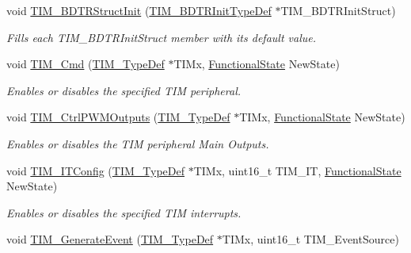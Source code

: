 \begin{DoxyCompactItemize}
void \mbox{\hyperlink{group___t_i_m___private___functions_gaea0f49938cda8ae0738162194798afc6}{T\+I\+M\+\_\+\+B\+D\+T\+R\+Struct\+Init}} (\mbox{\hyperlink{struct_t_i_m___b_d_t_r_init_type_def}{T\+I\+M\+\_\+\+B\+D\+T\+R\+Init\+Type\+Def}} $\ast$T\+I\+M\+\_\+\+B\+D\+T\+R\+Init\+Struct)
\begin{DoxyCompactList}\small\item\em Fills each T\+I\+M\+\_\+\+B\+D\+T\+R\+Init\+Struct member with its default value. \end{DoxyCompactList}\item 
void \mbox{\hyperlink{group___t_i_m___private___functions_ga2bdc275bcbd2ce9d1ba632e6c89896b7}{T\+I\+M\+\_\+\+Cmd}} (\mbox{\hyperlink{struct_t_i_m___type_def}{T\+I\+M\+\_\+\+Type\+Def}} $\ast$T\+I\+Mx, \mbox{\hyperlink{group___exported__types_gac9a7e9a35d2513ec15c3b537aaa4fba1}{Functional\+State}} New\+State)
\begin{DoxyCompactList}\small\item\em Enables or disables the specified T\+IM peripheral. \end{DoxyCompactList}\item 
void \mbox{\hyperlink{group___t_i_m___private___functions_ga3e59ebced2ab8e0b817c460f1670e97d}{T\+I\+M\+\_\+\+Ctrl\+P\+W\+M\+Outputs}} (\mbox{\hyperlink{struct_t_i_m___type_def}{T\+I\+M\+\_\+\+Type\+Def}} $\ast$T\+I\+Mx, \mbox{\hyperlink{group___exported__types_gac9a7e9a35d2513ec15c3b537aaa4fba1}{Functional\+State}} New\+State)
\begin{DoxyCompactList}\small\item\em Enables or disables the T\+IM peripheral Main Outputs. \end{DoxyCompactList}\item 
void \mbox{\hyperlink{group___t_i_m___private___functions_ga70e3d6c09d55ee69002e154c85cd40e4}{T\+I\+M\+\_\+\+I\+T\+Config}} (\mbox{\hyperlink{struct_t_i_m___type_def}{T\+I\+M\+\_\+\+Type\+Def}} $\ast$T\+I\+Mx, uint16\+\_\+t T\+I\+M\+\_\+\+IT, \mbox{\hyperlink{group___exported__types_gac9a7e9a35d2513ec15c3b537aaa4fba1}{Functional\+State}} New\+State)
\begin{DoxyCompactList}\small\item\em Enables or disables the specified T\+IM interrupts. \end{DoxyCompactList}\item 
void \mbox{\hyperlink{group___t_i_m___private___functions_ga38bd4ffda920dd4f7655a0a2c6100a6e}{T\+I\+M\+\_\+\+Generate\+Event}} (\mbox{\hyperlink{struct_t_i_m___type_def}{T\+I\+M\+\_\+\+Type\+Def}} $\ast$T\+I\+Mx, uint16\+\_\+t T\+I\+M\+\_\+\+Event\+Source)

\end{DoxyCompactItemize}

